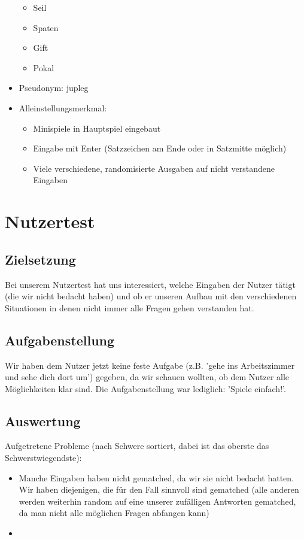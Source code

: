 \documentclass[10pt,a4paper]{article}
\begin{document}
\begin{itemize}
\begin{itemize}
\item Seil
\item Spaten
\item Gift
\item Pokal
\end{itemize}
\item Pseudonym: jupleg
\item Alleinstellungsmerkmal:
\begin{itemize}
\item Minispiele in Hauptspiel eingebaut
\item Eingabe mit Enter (Satzzeichen am Ende oder in Satzmitte möglich)
\item Viele verschiedene, randomisierte Ausgaben auf nicht verstandene Eingaben
\end{itemize}
\end{itemize}

\section*{Nutzertest}
\subsection*{Zielsetzung}
Bei unserem Nutzertest hat uns interessiert, welche Eingaben der Nutzer tätigt (die wir nicht bedacht haben) und ob er unseren Aufbau mit den verschiedenen Situationen in denen nicht immer alle Fragen gehen verstanden hat. 
\subsection*{Aufgabenstellung}
Wir haben dem Nutzer jetzt keine feste Aufgabe (z.B. 'gehe ins Arbeitszimmer und sehe dich dort um') gegeben, da wir schauen wollten, ob dem Nutzer alle Möglichkeiten klar sind. Die Aufgabenstellung war lediglich: 'Spiele einfach!'. \\

\subsection*{Auswertung}
Aufgetretene Probleme (nach Schwere sortiert, dabei ist das oberste das Schwerstwiegendste):
\begin{itemize}
\item Manche Eingaben haben nicht gematched, da wir sie nicht bedacht hatten. Wir haben diejenigen, die für den Fall sinnvoll sind gematched (alle anderen werden weiterhin random auf eine unserer zufälligen Antworten gematched, da man nicht alle möglichen Fragen abfangen kann)
\item
\end{itemize}
\end{document}
